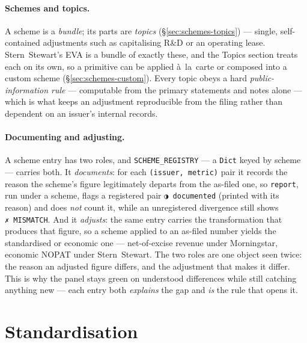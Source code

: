 \documentclass[11pt,a4paper]{report}
\newcommand{\statmark}[1]{{\symbolfont #1}}
\begin{document}
\paragraph{Schemes and topics.} A scheme is a \emph{bundle}; its parts are \emph{topics}
(\S\ref{sec:schemes-topics}) --- single, self-contained adjustments such as capitalising R\&D or an operating
lease. Stern~Stewart's EVA is a bundle of exactly these, and the Topics section treats each on its own, so a
primitive can be applied \`a~la~carte or composed into a custom scheme (\S\ref{sec:schemes-custom}). Every
topic obeys a hard \emph{public-information rule} --- computable from the primary statements and notes alone
--- which is what keeps an adjustment reproducible from the filing rather than dependent on an issuer's internal
records.

\paragraph{Documenting and adjusting.} A scheme entry has two roles, and \texttt{SCHEME\_REGISTRY} --- a
\texttt{Dict} keyed by scheme --- carries both. It \emph{documents}: for each \texttt{(issuer, metric)} pair
it records the reason the scheme's figure legitimately departs from the as-filed one, so \texttt{report},
run under a scheme, flags a registered pair \texttt{\statmark{◑}~documented} (printed with its reason) and does \emph{not}
count it, while an unregistered divergence still shows \texttt{\statmark{✗}~MISMATCH}. And it \emph{adjusts}: the same
entry carries the transformation that produces that figure, so a scheme applied to an as-filed number yields
the standardised or economic one --- net-of-excise revenue under Morningstar, economic NOPAT under
Stern~Stewart. The two roles are one object seen twice: the reason an adjusted figure differs, and the
adjustment that makes it differ. This is why the panel stays green on understood differences while still
catching anything new --- each entry both \emph{explains} the gap and \emph{is} the rule that opens it.

\section{Standardisation}
\label{sec:schemes-standardisation}
\end{document}
